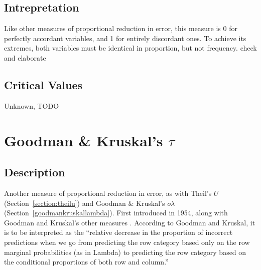 \documentclass[11pt]{article}
\begin{document}

\subsection{Intrepretation}
Like other measures of proportional reduction in error, this measure is 0 for perfectly accordant variables, and 1 for entirely discordant ones.  To achieve its extremes, both variables must be identical in proportion, but not frequency. {\color{red} check and elaborate}

\subsection{Critical Values}
Unknown, TODO












\section{Goodman \& Kruskal's $\tau$}
\label{section:goodmankruskaltau}
\subsection{Description}
Another measure of proportional reduction in error, as with Theil's $U$ (Section~\ref{section:theilu}) and Goodman \& Kruskal's $o\lambda$ (Section~\ref{goodmankruskallambda}).  First introduced in 1954, along with Goodman and Kruskal's other measures \cite{goodman1954measures}.
According to Goodman and Kruskal, it is to be interpreted as the ``relative decrease in the proportion of incorrect predictions when we go from predicting the row category based only on the row marginal probabilities (as in Lambda) to predicting the row category based on the conditional proportions of both row and column.''
\end{document}
